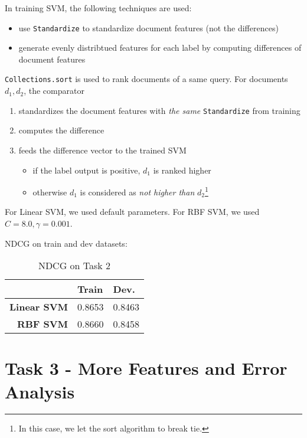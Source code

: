 \documentclass{article}
\begin{document}
In training SVM, the following techniques are used:

\begin{itemize}
    \item use \texttt{Standardize} to standardize document features (not the differences)
    \item generate evenly distribtued features for each label by computing differences of document features
\end{itemize}

\texttt{Collections.sort} is used to rank documents of a same query.
For documents $d_1,d_2$, the comparator

\begin{enumerate}
    \item standardizes the document features with \emph{the same} \texttt{Standardize} from training
    \item computes the difference
    \item feeds the difference vector to the trained SVM
        \begin{itemize}
            \item if the label output is positive, $d_1$ is ranked higher
            \item otherwise $d_1$ is considered as \emph{not higher than} $d_2$\footnote{In this case, we let the sort algorithm to break tie.}
        \end{itemize}
\end{enumerate}

For Linear SVM, we used default parameters. For RBF SVM, we used $C=8.0,\gamma=0.001$.

NDCG on train and dev datasets:

\begin{table}[!htb]
    \centering
    \begin{tabular}{| r | l | l |}
        \hline
        & \textbf{Train} & \textbf {Dev.} \\
        \hline
        \textbf{Linear SVM} & 0.8653 & 0.8463 \\
        \hline
        \textbf{RBF SVM} & 0.8660 & 0.8458 \\
        \hline
    \end{tabular}
    \caption{NDCG on Task 2}
\end{table}

\section{Task 3 - More Features and Error Analysis}
\end{document}
